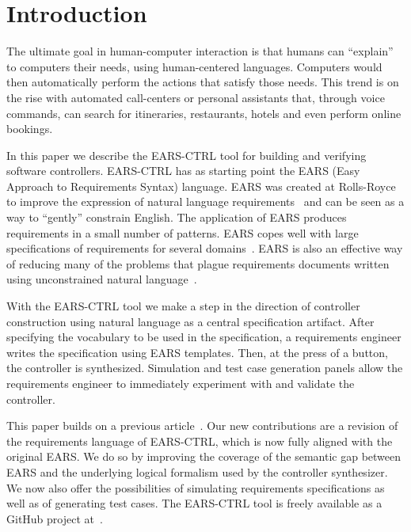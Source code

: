 \section{Introduction}
\vspace{-.5cm}The ultimate goal in human-computer interaction is that humans can
``explain'' to computers their needs, using human-centered languages. Computers
would then automatically perform the actions that satisfy those needs. This
trend is on the rise with automated call-centers or personal
assistants that, through voice commands, can search for itineraries,
restaurants, hotels and even perform online bookings.

In this paper we describe the \textsf{EARS-CTRL} tool for building and verifying
software controllers. \textsf{EARS-CTRL} has as starting point the EARS (Easy
Approach to Requirements Syntax) language. EARS was created at Rolls-Royce to
improve the expression of natural language requirements~\cite{EARS09} and can be
seen as a way to ``gently'' constrain English. The application of EARS produces
requirements in a small number of patterns. EARS copes well with large
specifications of requirements for several domains~\cite{EARS10,EARS16}. EARS is
also an effective way of reducing many of the problems that plague requirements
documents written using unconstrained natural language~\cite{EARS09}.

With the \textsf{EARS-CTRL} tool we make a step in the direction of controller
construction using natural language as a central specification artifact.
After specifying the vocabulary to be used in the specification, a requirements
engineer writes the specification using EARS templates. Then, at the press of a
button, the controller is synthesized. Simulation and test case
generation panels allow the requirements engineer to immediately
experiment with and validate the controller.

This paper builds on a previous article~\cite{LucioRCM17}.
Our new contributions are a revision of the requirements language of
\textsf{EARS-CTRL}, which is now fully aligned with the original EARS. We do so
by improving the coverage of the semantic gap between EARS and the underlying
logical formalism used by the controller synthesizer. We now also offer the
possibilities of simulating requirements specifications as well as of generating test cases.
The \textsf{EARS-CTRL} tool is freely available as a GitHub project
at~\cite{EARSProject}. \vspace{-.4cm}

% 


